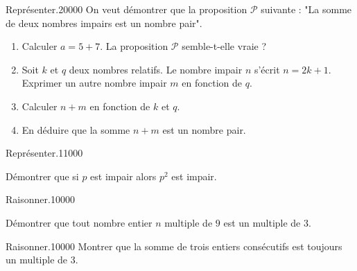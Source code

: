 \begin{pageParcoursd} 



\begin{ExoCdN}{Représenter.}{2}{0}{0}{0}{0}
On veut démontrer que la proposition $\mathcal P$ suivante : "La somme de deux nombres impairs est un nombre pair".

\begin{enumerate}
\item Calculer $a=5+7$. La proposition $\mathcal P$ semble-t-elle vraie ?
\item Soit $k$ et $q$ deux nombres relatifs. Le nombre impair $n$ s'écrit $n=2k+1$. Exprimer un autre nombre impair $m$ en fonction de $q$.
\item Calculer $n+m$ en fonction de $k$ et $q$. 
\item En déduire que la somme $n+m$ est un nombre pair. 
\end{enumerate}

\end{ExoCdN}

 
\begin{ExoCdN}{Représenter.}{1}{1}{0}{0}{0}

Démontrer que si $p$ est impair alors $p^2$ est impair.

 
\end{ExoCdN}

\begin{ExoCdN}{Raisonner.}{1}{0}{0}{0}{0}

Démontrer que tout nombre entier $n$ multiple de $9$ est un multiple de $3$.  

\end{ExoCdN}

\begin{ExoCdN}{Raisonner.}{1}{0}{0}{0}{0}
Montrer que la somme de trois entiers consécutifs est toujours un multiple de 3. 
\end{ExoCdN}


\end{pageParcoursd}
 
